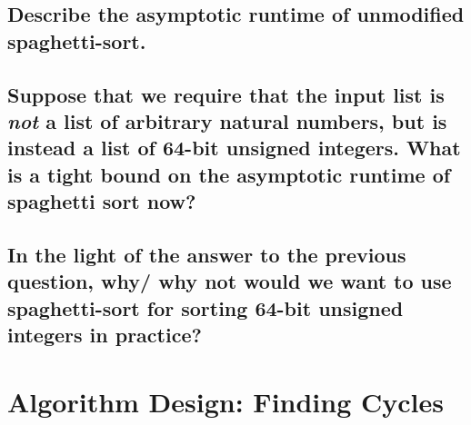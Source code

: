 \documentclass[11pt]{article}
\begin{document}
\subsection{Describe the asymptotic runtime of unmodified spaghetti-sort.}
	
\subsection{Suppose that we require that the input list is \emph{not} a list of arbitrary natural numbers, but is instead a list of 64-bit unsigned integers. What is a tight bound on the asymptotic runtime of spaghetti sort now?}
	
\subsection{In the light of the answer to the previous question, why/ why not would we want to use spaghetti-sort for sorting 64-bit unsigned integers in practice?}
	
\section{Algorithm Design: Finding Cycles}
\end{document}
